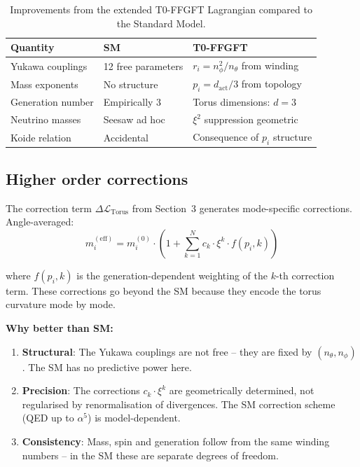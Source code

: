\begin{table}[htbp]
\centering\footnotesize
\begin{tabular}{lll}
\toprule
\textbf{Quantity} & \textbf{SM} & \textbf{T0-FFGFT} \\
\midrule
Yukawa couplings  & 12 free parameters & $r_i = n_\phi^2/n_\theta$ from winding \\
Mass exponents    & No structure       & $p_i = d_{\text{act}}/3$ from topology \\
Generation number & Empirically 3      & Torus dimensions: $d=3$ \\
Neutrino masses   & Seesaw ad hoc      & $\xi^2$ suppression geometric \\
Koide relation    & Accidental         & Consequence of $p_i$ structure \\
\bottomrule
\end{tabular}
\caption{Improvements from the extended T0-FFGFT Lagrangian
compared to the Standard Model.}
\label{tab:improvements}
\end{table}

\subsection{Higher order corrections}

The correction term $\Delta\mathcal{L}_{\text{Torus}}$ from
Section~3 generates mode-specific corrections. Angle-averaged:
\begin{equation}
    m_i^{(\text{eff})} = m_i^{(0)} \cdot
    \left(1 + \sum_{k=1}^{N} c_k \cdot \xi^k \cdot f(p_i, k)\right)
\end{equation}

where $f(p_i, k)$ is the generation-dependent weighting of the
$k$-th correction term. These corrections go beyond the SM because
they encode the torus curvature mode by mode.

\textbf{Why better than SM:}
\begin{enumerate}
    \item \textbf{Structural}: The Yukawa couplings are not free
          -- they are fixed by $(n_\theta, n_\phi)$.
          The SM has no predictive power here.

    \item \textbf{Precision}: The corrections $c_k \cdot \xi^k$
          are geometrically determined, not regularised by
          renormalisation of divergences. The SM correction
          scheme (QED up to $\alpha^5$) is model-dependent.

    \item \textbf{Consistency}: Mass, spin and generation follow
          from the same winding numbers -- in the SM these are
          separate degrees of freedom.
\end{enumerate}

